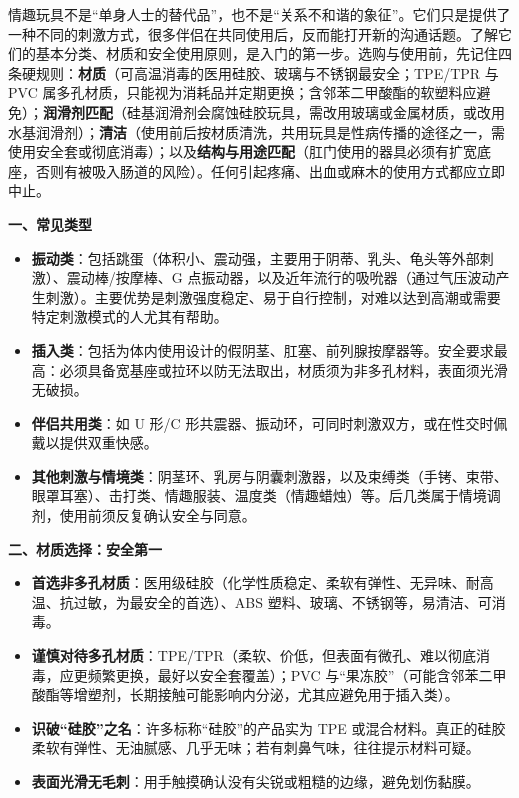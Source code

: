 \documentclass[12pt,UTF8]{ctexbook}
\begin{document}
情趣玩具不是“单身人士的替代品”，也不是“关系不和谐的象征”。它们只是提供了一种不同的刺激方式，很多伴侣在共同使用后，反而能打开新的沟通话题。了解它们的基本分类、材质和安全使用原则，是入门的第一步。选购与使用前，先记住四条硬规则：\textbf{材质}（可高温消毒的医用硅胶、玻璃与不锈钢最安全；TPE/TPR 与 PVC 属多孔材质，只能视为消耗品并定期更换；含邻苯二甲酸酯的软塑料应避免）；\textbf{润滑剂匹配}（硅基润滑剂会腐蚀硅胶玩具，需改用玻璃或金属材质，或改用水基润滑剂）；\textbf{清洁}（使用前后按材质清洗，共用玩具是性病传播的途径之一，需使用安全套或彻底消毒）；以及\textbf{结构与用途匹配}（肛门使用的器具必须有扩宽底座，否则有被吸入肠道的风险）。任何引起疼痛、出血或麻木的使用方式都应立即中止。

\textbf{一、常见类型}

\begin{itemize}
\item \textbf{振动类}：包括跳蛋（体积小、震动强，主要用于阴蒂、乳头、龟头等外部刺激）、震动棒/按摩棒、G 点振动器，以及近年流行的吸吮器（通过气压波动产生刺激）。主要优势是刺激强度稳定、易于自行控制，对难以达到高潮或需要特定刺激模式的人尤其有帮助。
\item \textbf{插入类}：包括为体内使用设计的假阴茎、肛塞、前列腺按摩器等。安全要求最高：必须具备宽基座或拉环以防无法取出，材质须为非多孔材料，表面须光滑无破损。
\item \textbf{伴侣共用类}：如 U 形/C 形共震器、振动环，可同时刺激双方，或在性交时佩戴以提供双重快感。
\item \textbf{其他刺激与情境类}：阴茎环、乳房与阴囊刺激器，以及束缚类（手铐、束带、眼罩耳塞）、击打类、情趣服装、温度类（情趣蜡烛）等。后几类属于情境调剂，使用前须反复确认安全与同意。
\end{itemize}

\textbf{二、材质选择：安全第一}

\begin{itemize}
\item \textbf{首选非多孔材质}：医用级硅胶（化学性质稳定、柔软有弹性、无异味、耐高温、抗过敏，为最安全的首选）、ABS 塑料、玻璃、不锈钢等，易清洁、可消毒。
\item \textbf{谨慎对待多孔材质}：TPE/TPR（柔软、价低，但表面有微孔、难以彻底消毒，应更频繁更换，最好以安全套覆盖）；PVC 与“果冻胶”（可能含邻苯二甲酸酯等增塑剂，长期接触可能影响内分泌，尤其应避免用于插入类）。
\item \textbf{识破“硅胶”之名}：许多标称“硅胶”的产品实为 TPE 或混合材料。真正的硅胶柔软有弹性、无油腻感、几乎无味；若有刺鼻气味，往往提示材料可疑。
\item \textbf{表面光滑无毛刺}：用手触摸确认没有尖锐或粗糙的边缘，避免划伤黏膜。
\end{itemize}
\end{document}
